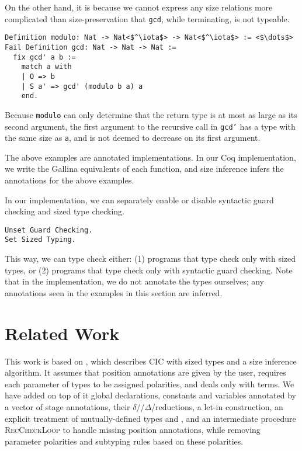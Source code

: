 \documentclass[sigplan,10pt,anonymous,review]{acmart}
\begin{document}
On the other hand, it is because we cannot express any size relations more complicated than size-preservation that \texttt{gcd}, while terminating, is not typeable.

\begin{verbatim}
Definition modulo: Nat -> Nat<$^\iota$> -> Nat<$^\iota$> := <$\dots$>
Fail Definition gcd: Nat -> Nat -> Nat :=
  fix gcd' a b :=
    match a with
    | O => b
    | S a' => gcd' (modulo b a) a
    end.
\end{verbatim}

Because \texttt{modulo} can only determine that the return type is at most as large as its second argument, the first argument to the recursive call in \texttt{gcd'} has a type with the same size as \texttt{a}, and is not deemed to decrease on its first argument.

The above examples are annotated \lang implementations.
In our Coq implementation, we write the Gallina equivalents of each function,
and size inference infers the annotations for the above examples.

In our implementation, we can separately enable or disable syntactic
guard checking and sized type checking.

\begin{verbatim}
Unset Guard Checking.
Set Sized Typing.
\end{verbatim}

This way, we can type check either: (1) programs that type check only with sized types, or (2) programs that type check only with syntactic guard checking. Note that in the implementation, we do not annotate the types ourselves; any annotations seen in the examples in this section are inferred.

\section{Related Work}\label{related}

This work is based on \CIChat \cite{cic-hat}, which describes CIC with sized types and a size inference algorithm. It assumes that position annotations are given by the user, requires each parameter of \coinductive types to be assigned polarities, and deals only with terms. We have added on top of it global declarations, constants and variables annotated by a vector of stage annotations, their $\delta$\-//$\Delta$\-/reductions, a let-in construction, an explicit treatment of mutually-defined \coinductive types and \cofixpoints, and an intermediate procedure \textsc{RecCheckLoop} to handle missing position annotations, while removing parameter polarities and subtyping rules based on these polarities.
\end{document}
